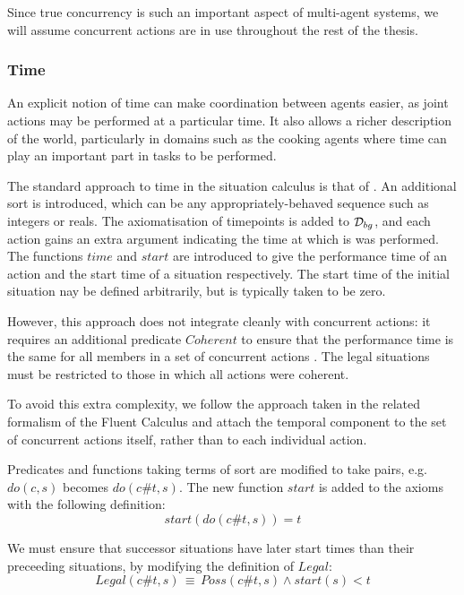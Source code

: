 Since true concurrency is such an important aspect of multi-agent
systems, we will assume concurrent actions are in use throughout the
rest of the thesis.


\subsubsection{Time}

An explicit notion of time can make coordination between agents easier,
as joint actions may be performed at a particular time. It also allows
a richer description of the world, particularly in domains such as
the cooking agents where time can play an important part in tasks
to be performed.

The standard approach to time in the situation calculus is that of
\citep{pinto94temporal,reiter96sc_nat_conc}. An additional sort 
is introduced, which can be any appropriately-behaved sequence such
as integers or reals. The axiomatisation of timepoints is added to
$\mathcal{D}_{bg}$, and each action gains an extra argument indicating the
time at which is was performed. The functions $time$ and $start$
are introduced to give the performance time of an action and the start
time of a situation respectively. The start time of the initial situation
nay be defined arbitrarily, but is typically taken to be zero.

However, this approach does not integrate cleanly with concurrent
actions: it requires an additional predicate $Coherent$ to ensure
that the performance time is the same for all members in a set of
concurrent actions \citep{reiter96sc_nat_conc}. The legal situations
must be restricted to those in which all actions were coherent.

To avoid this extra complexity, we follow the approach taken in the
related formalism of the Fluent Calculus \citep{martin03conc_flux}
and attach the temporal component to the set of concurrent actions
itself, rather than to each individual action.

Predicates and functions taking terms of sort  are modified
to take  pairs, e.g. $do(c,s)$ becomes
$do(c\#t,s)$. The new function $start$ is added to the axioms with
the following definition:\[
start(do(c\#t,s))=t\]


We must ensure that successor situations have later start times than
their preceeding situations, by modifying the definition of $Legal$:\[
Legal(c\#t,s)\,\equiv\, Poss(c\#t,s)\wedge start(s)<t\]


